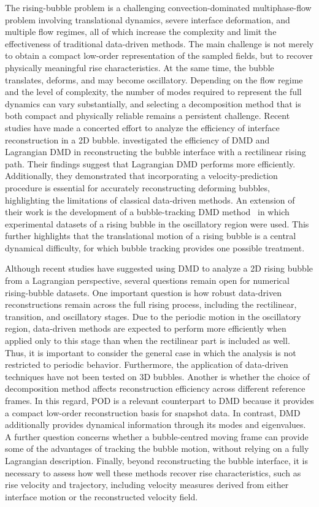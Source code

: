 \documentclass[a4paper,fleqn]{cas-sc}
\begin{document}
	The rising-bubble problem is a challenging convection-dominated multiphase-flow problem involving translational dynamics, severe interface deformation, and multiple flow regimes, all of which increase the complexity and limit the effectiveness of traditional data-driven methods. The main challenge is not merely to obtain a compact low-order representation of the sampled fields, but to recover physically meaningful rise characteristics. At the same time, the bubble translates, deforms, and may become oscillatory. Depending on the flow regime and the level of complexity, the number of modes required to represent the full dynamics can vary substantially, and selecting a decomposition method that is both compact and physically reliable remains a persistent challenge. Recent studies have made a concerted effort to analyze the efficiency of interface reconstruction in a 2D bubble. \citet{Yin2023a} investigated the efficiency of DMD and Lagrangian DMD in reconstructing the bubble interface with a rectilinear rising path. Their findings suggest that Lagrangian DMD performs more efficiently.
    Additionally, they demonstrated that incorporating a velocity-prediction procedure is essential for accurately reconstructing deforming bubbles, highlighting the limitations of classical data-driven methods. An extension of their work is the development of a bubble-tracking DMD method~\cite{Yin2023} in which experimental datasets of a rising bubble in the oscillatory region were used. This further highlights that the translational motion of a rising bubble is a central dynamical difficulty, for which bubble tracking provides one possible treatment.
	
	Although recent studies have suggested using DMD to analyze a 2D rising bubble from a Lagrangian perspective, several questions remain open for numerical rising-bubble datasets. One important question is how robust data-driven reconstructions remain across the full rising process, including the rectilinear, transition, and oscillatory stages. Due to the periodic motion in the oscillatory region, data-driven methods are expected to perform more efficiently when applied only to this stage than when the rectilinear part is included as well. Thus, it is important to consider the general case in which the analysis is not restricted to periodic behavior. Furthermore, the application of data-driven techniques have not been tested on 3D bubbles. Another is whether the choice of decomposition method affects reconstruction efficiency across different reference frames. In this regard, POD is a relevant counterpart to DMD because it provides a compact low-order reconstruction basis for snapshot data.
    In contrast, DMD additionally provides dynamical information through its modes and eigenvalues. A further question concerns whether a bubble-centred moving frame can provide some of the advantages of tracking the bubble motion, without relying on a fully Lagrangian description. Finally, beyond reconstructing the bubble interface, it is necessary to assess how well these methods recover rise characteristics, such as rise velocity and trajectory, including velocity measures derived from either interface motion or the reconstructed velocity field.
	
\end{document}
